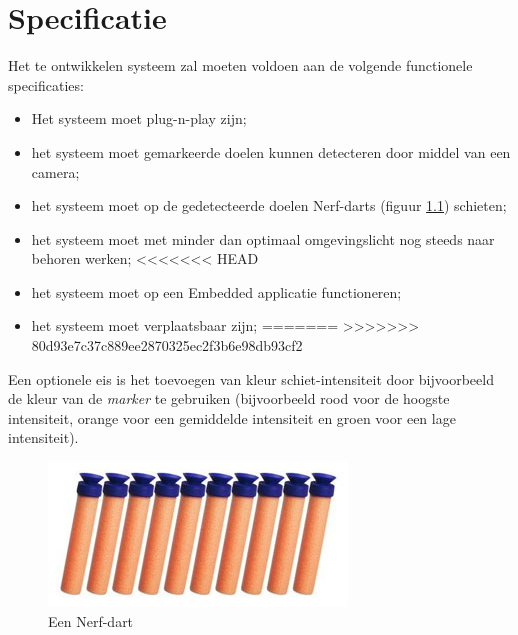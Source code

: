\chapter{Specificatie}

Het te ontwikkelen systeem zal moeten voldoen aan de volgende functionele
specificaties:

\begin{itemize}
    \item Het systeem moet plug-n-play zijn;
    \item het systeem moet gemarkeerde doelen kunnen detecteren door middel van
        een camera;
    \item het systeem moet op de gedetecteerde doelen Nerf-darts (figuur
        \ref{fig:dart}) schieten;
    \item het systeem moet met minder dan optimaal omgevingslicht nog steeds
        naar behoren werken;
<<<<<<< HEAD
    \item het systeem moet op een Embedded applicatie functioneren;
    \item het systeem moet verplaatsbaar zijn;
=======
>>>>>>> 80d93e7c37c889ee2870325ec2f3b6e98db93cf2
\end{itemize}

Een optionele eis is het toevoegen van kleur schiet-intensiteit door
bijvoorbeeld de kleur van de \emph{marker} te gebruiken (bijvoorbeeld rood
voor de hoogste intensiteit, orange voor een gemiddelde intensiteit en groen
voor een lage intensiteit).

\begin{figure}
    \begin{center}
        \includegraphics[scale=0.75]{figures/darts.jpg}
    \end{center}
    \caption{Een Nerf-dart}
    \label{fig:dart}
\end{figure}
